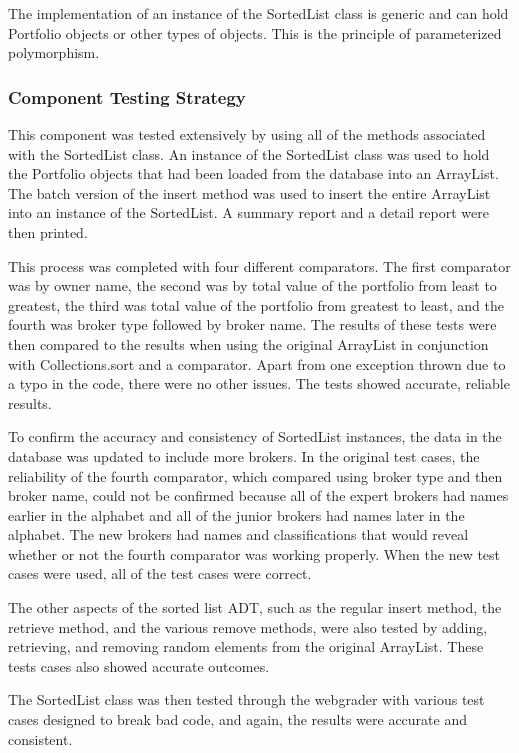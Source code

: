 \documentclass[12pt]{scrartcl} %
\begin{document}
    The implementation of an instance of the SortedList class is generic and can hold Portfolio objects or other types of objects.  This is the principle of parameterized polymorphism.

    \subsubsection{Component Testing Strategy}

    This component was tested extensively by using all of the methods associated with the SortedList class.  An instance of the SortedList class was used to hold the Portfolio objects that had been loaded from the database into an ArrayList.  The batch version of the insert method was used to insert the entire ArrayList into an instance of the SortedList.  A summary report and a detail report were then printed.

    This process was completed with four different comparators.  The first comparator was by owner name, the second was by total value of the portfolio from least to greatest, the third was total value of the portfolio from greatest to least, and the fourth was broker type followed by broker name.  The results of these tests were then compared to the results when using the original ArrayList in conjunction with Collections.sort and a comparator.  Apart from one exception thrown due to a typo in the code, there were no other issues.  The tests showed accurate, reliable results.

    To confirm the accuracy and consistency of SortedList instances, the data in the database was updated to include more brokers.  In the original test cases, the reliability of the fourth comparator, which compared using broker type and then broker name, could not be confirmed because all of the expert brokers had names earlier in the alphabet and all of the junior brokers had names later in the alphabet.  The new brokers had names and classifications that would reveal whether or not the fourth comparator was working properly.  When the new test cases were used, all of the test cases were correct.

    The other aspects of the sorted list ADT, such as the regular insert method, the retrieve method, and the various remove methods, were also tested by adding, retrieving, and removing random elements from the original ArrayList.  These tests cases also showed accurate outcomes.

    The SortedList class was then tested through the webgrader with various test cases designed to break bad code, and again, the results were accurate and consistent.
\end{document}
